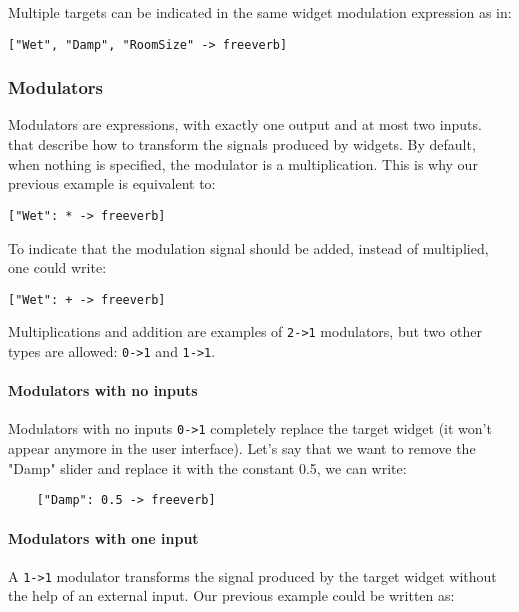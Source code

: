 Multiple targets can be indicated in the same widget modulation expression as in: 

\begin{lstlisting}
["Wet", "Damp", "RoomSize" -> freeverb]
\end{lstlisting}


\subsubsection{Modulators}

Modulators are \faust expressions, with exactly one output and at most two inputs. that describe how to transform the signals produced by widgets. By default, when nothing is specified, the modulator is a multiplication. This is why our previous example is equivalent to:
\begin{lstlisting}
["Wet": * -> freeverb]
\end{lstlisting}


To indicate that the modulation signal should be added, instead of multiplied, one could write:
\begin{lstlisting}
["Wet": + -> freeverb]
\end{lstlisting}

Multiplications and addition are examples of \lstinline`2->1` modulators, but two other types are allowed: \lstinline`0->1` and \lstinline`1->1`. 

\paragraph{Modulators with no inputs}

Modulators with no inputs \lstinline`0->1` completely replace the target widget (it won't appear anymore in the user interface). Let's say that we want to remove the "Damp" slider and replace it with the constant 0.5, we can write:

\begin{lstlisting}
    ["Damp": 0.5 -> freeverb]
\end{lstlisting}
    
\paragraph{Modulators with one input}
A \lstinline`1->1` modulator transforms the signal produced by the target widget without the help of an external input. Our previous example could be written as:

